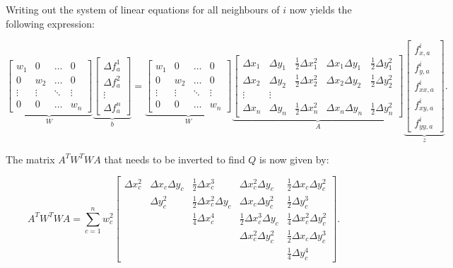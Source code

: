 \documentclass{article}
\begin{document}
Writing out the system of linear equations for all neighbours of $i$ now yields the following expression:

\begin{equation} \label{eq:disc_LSmatrix3}
\underbrace{\begin{bmatrix}
w_1 & 0 & \ldots & 0 \\ 0 & w_2 & \ldots & 0 \\ \vdots & \vdots & \ddots & \vdots \\ 0 & 0 & \ldots & w_n
 \end{bmatrix}}_W
\underbrace{\begin{bmatrix}
\Delta f_a^1 \\ \Delta f_a^2 \\ \vdots \\ \Delta f_a^n
 \end{bmatrix}}_b
 =
\underbrace{\begin{bmatrix}
w_1 & 0 & \ldots & 0 \\ 0 & w_2 & \ldots & 0 \\ \vdots & \vdots & \ddots & \vdots \\ 0 & 0 & \ldots & w_n
 \end{bmatrix}}_W
\underbrace{\begin{bmatrix}
\Delta x_1 & \Delta y_1 & \frac12 \Delta x_1^2 & \Delta x_1 \Delta y_1 & \frac12 \Delta y_1^2 \\
\Delta x_2 & \Delta y_2 & \frac12 \Delta x_2^2 & \Delta x_2 \Delta y_2 & \frac12 \Delta y_2^2 \\
\vdots & \vdots \\
\Delta x_n & \Delta y_n & \frac12 \Delta x_n^2 & \Delta x_n \Delta y_n & \frac12 \Delta y_n^2 
 \end{bmatrix}}_A
\underbrace{\begin{bmatrix}
f_{x,a}^i \\ f_{y,a}^i \\ f_{xx,a}^i \\ f_{xy,a}^i \\ f_{yy,a}^i
 \end{bmatrix}}_z.
\end{equation}

The matrix $A^T W^T W A$ that needs to be inverted to find $Q$ is now given by:

\begin{equation} \label{eq:disc_LSATWTWA2}
A^T W^T W A = \sum_{c=1}^n w_c^2
\begin{bmatrix}
\Delta x_c^2 & \Delta x_c \Delta y_c & \frac12 \Delta x_c^3 & \Delta x_c^2 \Delta y_c & \frac12 \Delta x_c \Delta y_c^2 \\
 & \Delta y_c^2 & \frac12 \Delta x_c^2 \Delta y_c & \Delta x_c \Delta y_c^2 & \frac12 \Delta y_c^3 \\ 
 & & \frac14 \Delta x_c^4 & \frac12 \Delta x_c^3 \Delta y_c & \frac14 \Delta x_c^2 \Delta y_c^2 \\ 
 & & & \Delta x_c^2 \Delta y_c^2 & \frac12 \Delta x_c \Delta y_c^3 \\
 & & & & \frac14 \Delta y_c^4
\end{bmatrix}.
\end{equation}
\end{document}
